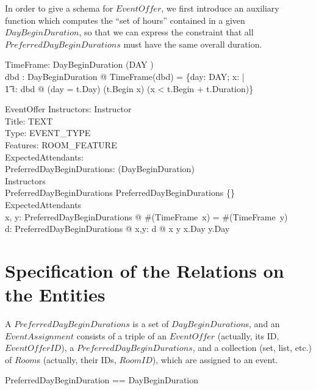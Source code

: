 \documentclass[a4paper]{article}
\begin{document}
In order to give a schema for $EventOffer$, we first introduce an auxiliary
function which computes the ``set of hours'' contained in a given
$DayBeginDuration$, so that we can express the constraint that all
$PreferredDayBeginDurations$ must have the same overall duration.
\begin{axdef}
  TimeFrame: \power DayBeginDuration \fun \power (DAY \cross \nat) \\
  \where 
  \forall dbd : \power DayBeginDuration @ TimeFrame(dbd) =
  \{day: DAY; x: \nat | \\
  \t1 \exists t: dbd @ (day = t.Day) \land (t.Begin \leq x) \land (x
  < t.Begin + t.Duration)\}
\end{axdef}
\begin{schema}{EventOffer}
  Instructors: \power Instructor \\
  Title: TEXT \\
  Type: EVENT\_TYPE \\
  Features: \power ROOM\_FEATURE \\
  ExpectedAttendants: \nat \\
  PreferredDayBeginDurations: \power (\power DayBeginDuration) \\
  \where
  Instructors \neq \emptyset \\
  PreferredDayBeginDurations \neq \emptyset \land PreferredDayBeginDurations
  \neq \{\emptyset\} \\ 
  ExpectedAttendants  \\
  \forall x, y: PreferredDayBeginDurations @ \#(TimeFrame~x) = \#(TimeFrame~y)
  \\ 
  \forall d: PreferredDayBeginDurations @ \forall x,y: d @ x \neq y \implies
  x.Day \neq y.Day \\ 
\end{schema}


\section{Specification of the Relations on the Entities} 


\vspace{1ex}\noindent
A $PreferredDayBeginDurations$ is a set of $DayBeginDuration$s, and an
$EventAssignment$ consists of a triple of an $EventOffer$ (actually, its ID,
$EventOfferID$), a $PreferredDayBeginDurations$, and a collection (set, list,
etc.) of $Room$s (actually, their IDs, $RoomID$), which are assigned to an
event.
\begin{zed}
  PreferredDayBeginDuration ==  \power DayBeginDuration \\
\end{zed}
\end{document}
